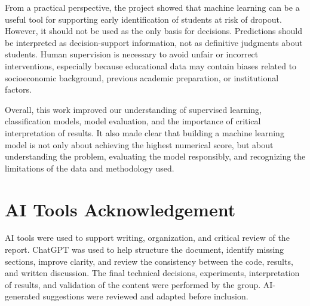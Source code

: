 \documentclass[lettersize,journal]{IEEEtran}
\begin{document}
From a practical perspective, the project showed that machine learning can be a useful tool for supporting early identification of students at risk of dropout. However, it should not be used as the only basis for decisions. Predictions should be interpreted as decision-support information, not as definitive judgments about students. Human supervision is necessary to avoid unfair or incorrect interventions, especially because educational data may contain biases related to socioeconomic background, previous academic preparation, or institutional factors.

Overall, this work improved our understanding of supervised learning, classification models, model evaluation, and the importance of critical interpretation of results. It also made clear that building a machine learning model is not only about achieving the highest numerical score, but about understanding the problem, evaluating the model responsibly, and recognizing the limitations of the data and methodology used.

\section*{AI Tools Acknowledgement}
AI tools were used to support writing, organization, and critical review of the report. ChatGPT was used to help structure the document, identify missing 
sections, improve clarity, and review the consistency between the code, results, and written discussion. The final technical decisions, experiments, interpretation 
of results, and validation of the content were performed by the group. AI-generated suggestions were reviewed and adapted before inclusion.
\end{document}

